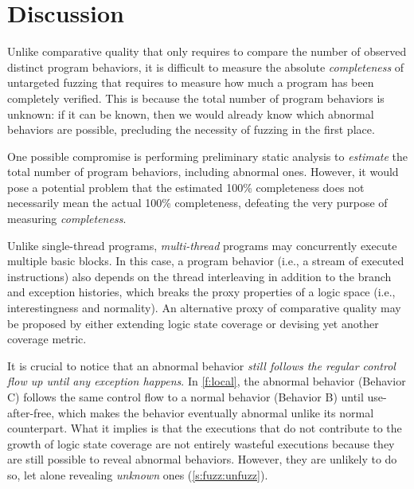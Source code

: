 \documentclass[letterpaper,twocolumn,10pt]{article}
\begin{document}
\section{Discussion}
\label{s:disc}

%
Unlike comparative quality that only requires to compare the number of observed
distinct program behaviors, it is difficult to measure the absolute
\emph{completeness} of untargeted fuzzing that requires to measure how much a
program has been completely verified. This is because the total number of
program behaviors is unknown: if it can be known, then we would already know
which abnormal behaviors are possible, precluding the necessity of fuzzing in
the first place.

One possible compromise is performing preliminary static analysis to
\emph{estimate} the total number of program behaviors, including abnormal ones.
However, it would pose a potential problem that the estimated 100\% completeness
does not necessarily mean the actual 100\% completeness, defeating the very
purpose of measuring \textit{completeness}.

%
Unlike single-thread programs, \emph{multi-thread} programs may concurrently
execute multiple basic blocks. In this case, a program behavior (i.e., a stream
of executed instructions) also depends on the thread interleaving in
addition to the branch and exception histories, which breaks the proxy
properties of a logic space (i.e., interestingness and normality).
An alternative proxy of comparative quality may be proposed by either
extending logic state coverage or devising yet another coverage metric.

%
It is crucial to notice that an abnormal behavior \emph{still follows the
regular control flow up until any exception happens}. In \autoref{f:local}, the
abnormal behavior (Behavior C) follows the same control flow to a normal
behavior (Behavior B) until use-after-free, which makes the behavior eventually
abnormal unlike its normal counterpart. 
%
What it implies is that the executions that do not contribute to the growth of
logic state coverage are not entirely wasteful executions because they are still
possible to reveal abnormal behaviors. However, they are unlikely to do so, let
alone revealing \emph{unknown} ones (\autoref{s:fuzz:unfuzz}).

\end{document}
